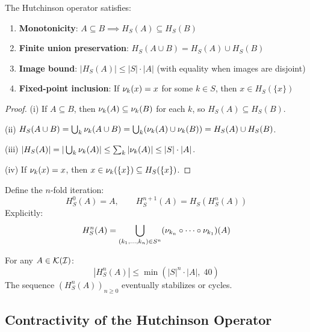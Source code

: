 \begin{proposition}
\label{prop:hutchinson-props}
The Hutchinson operator satisfies:
\begin{enumerate}[label=(\roman*)]
  \item \textbf{Monotonicity}: $A \subseteq B \implies H_S(A) \subseteq H_S(B)$
  \item \textbf{Finite union preservation}: $H_S(A \cup B) = H_S(A) \cup H_S(B)$
  \item \textbf{Image bound}: $|H_S(A)| \leq |S| \cdot |A|$ (with equality when images are disjoint)
  \item \textbf{Fixed-point inclusion}: If $\nu_{k}(x) = x$ for some $k \in S$, then $x \in H_S(\{x\})$
\end{enumerate}
\end{proposition}

\begin{proof}
(i) If $A \subseteq B$, then $\nu_{k}(A) \subseteq \nu_{k}(B)$ for each $k$, so $H_S(A) \subseteq H_S(B)$.

(ii) $H_S(A \cup B) = \bigcup_k \nu_{k}(A \cup B) = \bigcup_k (\nu_{k}(A) \cup \nu_{k}(B)) = H_S(A) \cup H_S(B)$.

(iii) $|H_S(A)| = |\bigcup_k \nu_{k}(A)| \leq \sum_k |\nu_{k}(A)| \leq |S| \cdot |A|$.

(iv) If $\nu_{k}(x) = x$, then $x \in \nu_{k}(\{x\}) \subseteq H_S(\{x\})$.
\end{proof}

\begin{definition}
\label{def:iterated-hutchinson}
Define the $n$-fold iteration:
\[
H_S^0(A) = A, \qquad H_S^{n+1}(A) = H_S(H_S^n(A))
\]
Explicitly:
\[
H_S^n(A) = \bigcup_{(k_1, \ldots, k_n) \in S^n} (\nu_{k_n} \circ \cdots \circ \nu_{k_1})(A)
\]
\end{definition}

\begin{proposition}
\label{prop:iteration-growth}
For any $A \in \mathcal{K}(\mathcal{I})$:
\[
|H_S^n(A)| \leq \min(|S|^n \cdot |A|, \; 40)
\]
The sequence $(H_S^n(A))_{n \geq 0}$ eventually stabilizes or cycles.
\end{proposition}

\subsection{Contractivity of the Hutchinson Operator}

